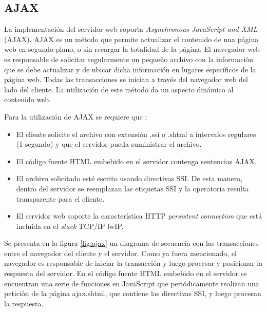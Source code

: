 \subsection{AJAX}
\label{sec:ajax}

La implementación del servidor web soporta \textit{Asynchronous JavaScript and XML} (AJAX). AJAX es un método que permite actualizar el contenido de una página web en segundo plano, o sin recargar la totalidad de la página.  El navegador web es responsable de solicitar regularmente un pequeño archivo con la información que se debe actualizar y de ubicar dicha información en lugares específicos de la página web. Todas las transacciones se inician a través del navegador web del lado del cliente. La utilización de este método da un aspecto dinámico al contenido web. 

Para la utilización de AJAX se requiere que :

\begin{itemize}
\item El cliente solicite el archivo con extensión .ssi o .shtml a intervalos regulares (1 segundo) y que el servidor pueda suministrar el archivo.
\item El código fuente HTML embebido en el servidor contenga sentencias AJAX.
\item El archivo solicitado esté escrito usando directivas SSI. De esta manera, dentro del servidor se reemplazan las etiquetas SSI y la operatoria resulta transparente para el cliente.
\item El servidor web soporte la característica HTTP \textit{persistent connection} que está incluida en el \textit{stack} TCP/IP lwIP.
\end{itemize}

Se presenta en la figura \ref{fig:ajax} un diagrama de secuencia con las transacciones entre el navegador del cliente y el servidor.  Como ya fuera mencionado, el navegador es responsable de iniciar la transacción y luego procesar y posicionar la respuesta del servidor.  En el código fuente HTML embebido en el servidor se encuentran una serie de funciones en JavaScript que periódicamente realizan una petición de la página ajax.shtml, que contiene las directivas SSI, y luego procesan la respuesta.

